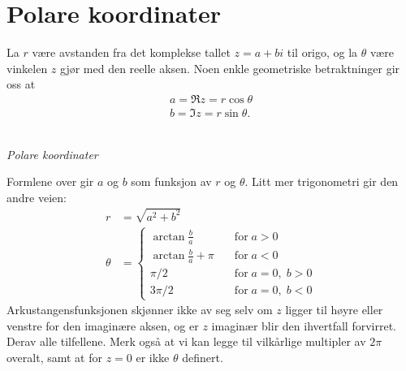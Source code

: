 \section*{Polare koordinater}
La $r$ være avstanden fra det komplekse tallet $z=a+bi$ til origo, 
og la $\theta$ være vinkelen $z$ gjør med den reelle aksen. 
Noen enkle geometriske betraktninger gir oss at 
\begin{align*}
a=\Re z = r\cos \theta \\
b=\Im z = r\sin \theta.
\end{align*}
\begin{center}
\\
{\small \textit{Polare koordinater}}
\end{center}
Formlene over gir $a$ og $b$ som funksjon av $r$ og $\theta$. 
Litt mer trigonometri gir den andre veien:
\begin{align*}
r&=\sqrt{a^2+b^2} \\
\theta&= \begin{cases} \arctan \frac{b}{a} \quad &\text{for}\; a>0\\ \arctan \frac{b}{a} + \pi \quad &\text{for}\;  a<0 \\  \pi/2 \quad &\text{for}\;  a=0, \; b>0 \\ 3\pi/2 \quad &\text{for}\;  a=0, \; b<0  \end{cases}
\end{align*}
Arkustangensfunksjonen skjønner ikke av seg selv om 
$z$ ligger til høyre eller venstre for den imaginære aksen, 
og er $z$ imaginær blir den ihvertfall forvirret. Derav alle tilfellene.
 Merk også at vi kan legge til vilkårlige multipler av $2\pi$ overalt, samt at for $z=0$ er ikke $\theta$ definert.
 
